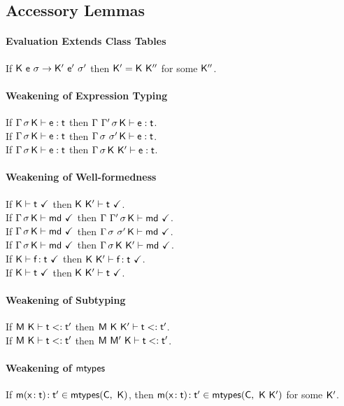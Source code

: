 \documentclass[acmlarge, anonymous, authordraft, review]{acmart} %
\begin{document}
\subsection*{Accessory Lemmas}

\paragraph{Evaluation Extends Class Tables} $~$\\
If $\Reduce \K\e\s \Kp\ep\sp$ then ${{\sf{K'}}} = {\sf{K}}~{{\sf{K''}}}$ for some ${{\sf{K''}}}$.

\paragraph{Weakening of Expression Typing}$~$\\
If $\EnvType\Env\s\K\e\t$ then $\EnvType{\Env~\Envp}\s\K\e\t$. \\ 
If $\EnvType\Env\s\K\e\t$ then $\EnvType\Env{\s~\s'}\K\e\t$. \\ 
If $\EnvType\Env\s\K\e\t$ then $\EnvType\Env\s{\K~\Kp}\e\t$. 

\paragraph{Weakening of Well-formedness}$~$\\
If $\WFtype\K\t$ then $\WFtype{\K~\Kp}\t$. \\
If $\WF\Env\s\K\md$ then $\WF{\Env~\Envp}\s\K\md$.\\
If $\WF\Env\s\K\md$ then $\WF\Env{\s~\s'}\K\md$.\\
If $\WF\Env\s\K\md$ then $\WF\Env\s{\K~\Kp}\md$.\\
If $\WFtype\K{\Fdef\f\t}$ then $\WFtype{\K~\Kp}{\Fdef\f\t}$.\\
If $\WFtype\K\t$ then $\WFtype{\K~\Kp}\t$.

\paragraph{Weakening of Subtyping}$~$\\
If $\StrSub\M{\K}\t\tp$ then $\StrSub\M{\K~\Kp}\t\tp$. \\
If $\StrSub{\M}{\K}\t\tp$ then $\StrSub{\M~\M'}{\K}\t\tp$.

\paragraph{Weakening of ${\sf{mtypes}}$}$~$\\
If $\Mtype\m{\HT\x\t}\tp \in \classoff{\C}{\K}$, then $\Mtype\m{\HT\x\t}\tp \in \classoff{\C}{\K~\Kp}$ for some ${{\sf{K'}}}$.
\end{document}
